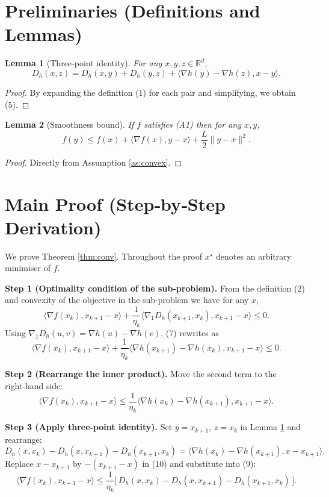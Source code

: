 \documentclass[11pt]{article}
\newtheorem{lemma}{Lemma}
\newcommand{\grad}{\nabla}
\newcommand{\D}{D_{h}}
\newcommand{\inner}[2]{\langle #1,#2\rangle}
\newcommand{\R}{\mathbb{R}}
\begin{document}
\newpage
\section*{Preliminaries (Definitions and Lemmas)}
\begin{lemma}[Three‑point identity]\label{lem:three}
For any $x,y,z\in\R^{d}$,
\[
\D(x,z)=\D(x,y)+\D(y,z)+\inner{\grad h(y)-\grad h(z)}{x-y}.
\tag{5}
\]
\end{lemma}
\begin{proof}
By expanding the definition (1) for each pair and simplifying, we obtain (5). \hfill\qedsymbol
\end{proof}

\begin{lemma}[Smoothness bound]\label{lem:smooth}
If $f$ satisfies (A1) then for any $x,y$,
\[
f(y)\le f(x)+\inner{\grad f(x)}{y-x}+\frac{L}{2}\|y-x\|^{2}.
\tag{6}
\]
\end{lemma}
\begin{proof}
Directly from Assumption \ref{as:convex}. \hfill\qedsymbol
\end{proof}

\section*{Main Proof (Step‑by‑Step Derivation)}
We prove Theorem \ref{thm:conv}. Throughout the proof $x^{\star}$ denotes an arbitrary minimiser of $f$.

\medskip
\noindent\textbf{Step 1 (Optimality condition of the sub‑problem).}  
From the definition (2) and convexity of the objective in the sub‑problem we have for any $x$,
\[
\inner{\grad f(x_{k})}{x_{k+1}-x}
    +\frac{1}{\eta_{k}}\inner{\grad_{1}\D(x_{k+1},x_{k})}{x_{k+1}-x}\le0.
\tag{7}
\]
Using $\grad_{1}\D(u,v)=\grad h(u)-\grad h(v)$, (7) rewrites as
\[
\inner{\grad f(x_{k})}{x_{k+1}-x}
    +\frac{1}{\eta_{k}}\inner{\grad h(x_{k+1})-\grad h(x_{k})}{x_{k+1}-x}\le0.
\tag{8}
\]

\medskip
\noindent\textbf{Step 2 (Rearrange the inner product).}  
Move the second term to the right‑hand side:
\[
\inner{\grad f(x_{k})}{x_{k+1}-x}
    \le\frac{1}{\eta_{k}}\inner{\grad h(x_{k})-\grad h(x_{k+1})}{x_{k+1}-x}.
\tag{9}
\]

\medskip
\noindent\textbf{Step 3 (Apply three‑point identity).}  
Set $y=x_{k+1}$, $z=x_{k}$ in Lemma \ref{lem:three} and rearrange:
\[
\D(x,x_{k})-\D(x,x_{k+1})-\D(x_{k+1},x_{k})
   =\inner{\grad h(x_{k})-\grad h(x_{k+1})}{x-x_{k+1}}.
\tag{10}
\]
Replace $x-x_{k+1}$ by $-(x_{k+1}-x)$ in (10) and substitute into (9):
\[
\inner{\grad f(x_{k})}{x_{k+1}-x}
    \le\frac{1}{\eta_{k}}\big[\,\D(x,x_{k})-\D(x,x_{k+1})-\D(x_{k+1},x_{k})\,\big].
\tag{11}
\]
\end{document}
